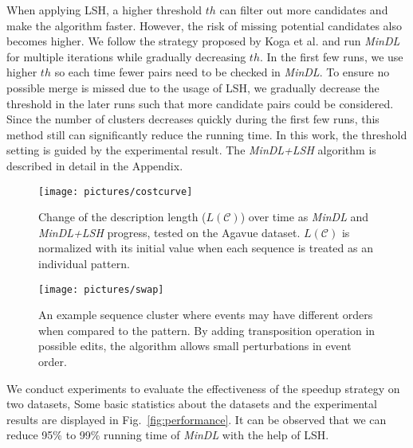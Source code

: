 When applying LSH, a higher threshold $th$ can filter out more candidates and make the algorithm faster. However, the risk of missing potential candidates also becomes higher. We follow the strategy proposed by Koga et al. \cite{Koga2007} and run \textit{MinDL} for multiple iterations while gradually decreasing $th$. In the first few runs, we use higher $th$ so each time fewer pairs need to be checked in \textit{MinDL}. To ensure no possible merge is missed due to the usage of LSH, we gradually decrease the threshold in the later runs such that more candidate pairs could be considered. Since the number of clusters decreases quickly during the first few runs, this method still can significantly reduce the running time. In this work, the threshold setting is guided by the experimental result. The \textit{MinDL+LSH} algorithm is described in detail in the Appendix.

\begin{figure}[h]
	\centering
	\texttt{[image: pictures/costcurve]}
	\caption{Change of the description length ($L(\mathscr{C})$) over time as \textit{MinDL} and \textit{MinDL+LSH} progress, tested on the Agavue dataset. $L(\mathscr{C})$ is normalized with its initial value when each sequence is treated as an individual pattern. }
	\label{fig:costcurve}
\end{figure}

\begin{figure}[h]
	\centering
	\texttt{[image: pictures/swap]}
	\caption{An example sequence cluster where events may have different orders when compared to the pattern. By adding transposition operation in possible edits, the algorithm allows small perturbations in event order.}
	\label{fig:swap}
\end{figure}

We conduct experiments to evaluate the effectiveness of the speedup strategy on two datasets,   
Some basic statistics about the datasets and the experimental results are displayed in Fig.~\ref{fig:performance}. It can be observed that we can reduce 95\% to 99\% running time of \textit{MinDL} with the help of LSH. 

